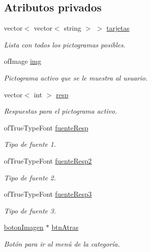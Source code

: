 \subsection*{Atributos privados}
\begin{DoxyCompactItemize}
\item 
vector$<$ vector$<$ string $>$ $>$ \hyperlink{classespacio_tarjetas_a4f544a79ef84de1cd86c659fad6c762c}{tarjetas}
\begin{DoxyCompactList}\small\item\em Lista con todos los pictogramas posibles. \end{DoxyCompactList}\item 
of\+Image \hyperlink{classespacio_tarjetas_afa80c75849eae23d80adb0d66ffbd540}{img}
\begin{DoxyCompactList}\small\item\em Pictograma activo que se le muestra al usuario. \end{DoxyCompactList}\item 
vector$<$ int $>$ \hyperlink{classespacio_tarjetas_a3f296834b82b6e44ebc15999d949b547}{resp}
\begin{DoxyCompactList}\small\item\em Respuestas para el pictograma activo. \end{DoxyCompactList}\item 
of\+True\+Type\+Font \hyperlink{classespacio_tarjetas_a0ae5d7269e77bc44651ca7c8f3435ef9}{fuente\+Resp}
\begin{DoxyCompactList}\small\item\em Tipo de fuente 1. \end{DoxyCompactList}\item 
of\+True\+Type\+Font \hyperlink{classespacio_tarjetas_a69c647527325428e7cb3e0c40d8f6bea}{fuente\+Resp2}
\begin{DoxyCompactList}\small\item\em Tipo de fuente 2. \end{DoxyCompactList}\item 
of\+True\+Type\+Font \hyperlink{classespacio_tarjetas_abec283907dd3683168265677e9df9659}{fuente\+Resp3}
\begin{DoxyCompactList}\small\item\em Tipo de fuente 3. \end{DoxyCompactList}\item 
\hyperlink{classboton_imagen}{boton\+Imagen} $\ast$ \hyperlink{classespacio_tarjetas_afc558908c2d0b48e3d7917722ff05a4d}{btn\+Atras}
\begin{DoxyCompactList}\small\item\em Botón para ir al menú de la categoría. \end{DoxyCompactList}\item 

\end{DoxyCompactItemize}
